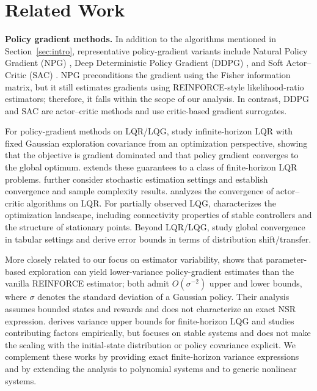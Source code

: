 \section{Related Work}
\label{sec:related-work}

\textbf{Policy gradient methods.}
In addition to the algorithms mentioned in Section~\ref{sec:intro}, representative policy-gradient variants include Natural Policy Gradient (NPG) \cite{kakade01neurips-npg}, Deep Deterministic Policy Gradient (DDPG) \cite{lillicrap15arxiv-ddpg}, and Soft Actor--Critic (SAC) \cite{haarnoja18icml-sac}. NPG preconditions the gradient using the Fisher information matrix, but it still estimates gradients using REINFORCE-style likelihood-ratio estimators; therefore, it falls within the scope of our analysis. In contrast, DDPG and SAC are actor--critic methods and use critic-based gradient surrogates.

For policy-gradient methods on LQR/LQG, \cite{fazel18icml-lqrglobal} study infinite-horizon LQR with fixed Gaussian exploration covariance from an optimization perspective, showing that the objective is gradient dominated and that policy gradient converges to the global optimum. \cite{furieri20l4dc-finitelqr} extends these guarantees to a class of finite-horizon LQR problems. \cite{malik20jmlr-stochasticlqroptimization,mohammadi21tac-stochasticlqroptimization} further consider stochastic estimation settings and establish convergence and sample complexity results. \cite{yang19neurips-actorcriticlqr} analyzes the convergence of actor--critic algorithms on LQR. For partially observed LQG, \cite{tang23mp-lqglandscape} characterizes the optimization landscape, including connectivity properties of stable controllers and the structure of stationary points. Beyond LQR/LQG, \cite{mei20icml-globalconvergence,agarwal21jmlr-tabularglobalconveregnce} study global convergence in tabular settings and derive error bounds in terms of distribution shift/transfer.

More closely related to our focus on estimator variability, \cite{zhao11neurips-pgvariance} shows that parameter-based exploration can yield lower-variance policy-gradient estimates than the vanilla REINFORCE estimator; both admit $O(\sigma^{-2})$ upper and lower bounds, where $\sigma$ denotes the standard deviation of a Gaussian policy. Their analysis assumes bounded states and rewards and does not characterize an exact NSR expression. \cite{preiss19arxiv-lqgvariance} derives variance upper bounds for finite-horizon LQG and studies contributing factors empirically, but focuses on stable systems and does not make the scaling with the initial-state distribution or policy covariance explicit. We complement these works by providing exact finite-horizon variance expressions and by extending the analysis to polynomial systems and to generic nonlinear systems.

